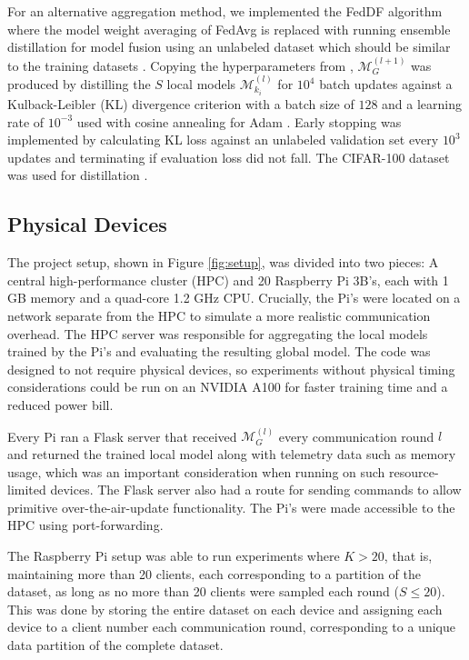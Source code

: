 \documentclass{article}
\begin{document}
For an alternative aggregation method, we implemented the FedDF algorithm where the model weight averaging of FedAvg is replaced with running ensemble distillation for model fusion using an unlabeled dataset which should be similar to the training datasets \cite{lin2020ensemble}.
Copying the hyperparameters from \cite{lin2020ensemble}, $\mathcal M_G^{(l + 1)}$ was produced by distilling the $S$ local models $\mathcal M_{k_i}^{(l)}$ for $10^4$ batch updates against a Kulback-Leibler (KL) divergence criterion with a batch size of $128$ and a learning rate of $10^{-3}$ used with cosine annealing for Adam \cite{losh2016sgdr,kingma2015adam}.
Early stopping was implemented by calculating KL loss against an unlabeled validation set every $10^3$ updates and terminating if evaluation loss did not fall.
The CIFAR-100 dataset was used for distillation \cite{alex2009learning}.

\subsection{Physical Devices}
The project setup, shown in Figure \ref{fig:setup}, was divided into two pieces: A central high-performance cluster (HPC) and 20 Raspberry Pi 3B's, each with 1 GB memory and a quad-core 1.2 GHz CPU.
Crucially, the Pi's were located on a network separate from the HPC to simulate a more realistic communication overhead.
The HPC server was responsible for aggregating the local models trained by the Pi's and evaluating the resulting global model.
The code was designed to not require physical devices, so experiments without physical timing considerations could be run on an NVIDIA A100 for faster training time and a reduced power bill.

Every Pi ran a Flask server that received $\mathcal M_G^{(l)}$ every communication round $l$ and returned the trained local model along with telemetry data such as memory usage, which was an important consideration when running on such resource-limited devices.
The Flask server also had a route for sending commands to allow primitive over-the-air-update functionality.
The Pi's were made accessible to the HPC using port-forwarding.

The Raspberry Pi setup was able to run experiments where $K > 20$, that is, maintaining more than 20 clients, each corresponding to a partition of the dataset, as long as no more than 20 clients were sampled each round ($S \leq 20$).
This was done by storing the entire dataset on each device and assigning each device to a client number each communication round, corresponding to a unique data partition of the complete dataset.
\end{document}
